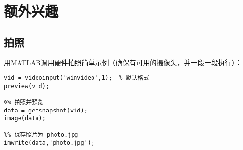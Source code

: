 \section{额外兴趣}

\subsection{拍照}
用MATLAB调用硬件拍照简单示例（确保有可用的摄像头，并一段一段执行）：

\vspace{-0.8cm}
\begin{lstlisting}[caption = 拍照]
%% 打开摄像头
vid = videoinput('winvideo',1);  % 默认格式
preview(vid);

%% 拍照并预览
data = getsnapshot(vid);
image(data);

%% 保存照片为 photo.jpg
imwrite(data,'photo.jpg');
\end{lstlisting}





